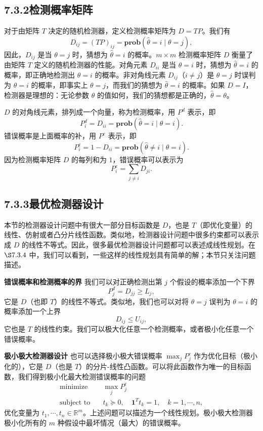 \documentclass[UTF8,12pt,a4paper,fontset=fandol]{ctexart}
\begin{document}
\subsection*{7.3.2\quad 检测概率矩阵}

对于由矩阵 $T$ 决定的随机检测器，定义检测概率矩阵为 $D=TP$。我们有
\[
D_{ij}=(TP)_{ij}=\mathbf{prob}(\hat{\theta}=i\mid \theta=j),
\]
因此，$D_{ij}$ 是当 $\theta=j$ 时，猜想为 $\hat{\theta}=i$ 的概率。$m\times m$ 检测概率矩阵 $D$ 衡量了由矩阵 $T$ 定义的随机检测器的性能。对角元素 $D_{ii}$ 是当 $\theta=i$ 时，猜想为 $\hat{\theta}=i$ 的概率，即正确地检测出 $\theta=i$ 的概率。非对角线元素 $D_{ij}$（$i\neq j$）是 $\theta=j$ 时误判为 $\theta=i$ 的概率，即事实上 $\theta=j$，而我们的猜想为 $\hat{\theta}=i$ 的概率。如果 $D=I$，检测器是理想的：无论参数 $\theta$ 的值如何，我们的猜想都是正确的，$\hat{\theta}=\theta$。

$D$ 的对角线元素，排列成一个向量，称为检测概率，用 $P^d$ 表示，即
\[
P_i^d=D_{ii}=\mathbf{prob}(\hat{\theta}=i\mid \theta=i).
\]
错误概率是上面概率的补，用 $P^e$ 表示，即
\[
P_i^e=1-D_{ii}=\mathbf{prob}(\hat{\theta}\neq i\mid \theta=i).
\]
因为检测概率矩阵 $D$ 的每列和为 $1$，错误概率可以表示为
\[
P_i^e=\sum_{j\neq i}D_{ji}.
\]

\subsection*{7.3.3\quad 最优检测器设计}

本节的检测器设计问题中有很大一部分目标函数是 $D$，也是 $T$（即优化变量）的线性、仿射或者凸分片线性函数。类似地，检测器设计问题中很多约束都可以表示成 $D$ 的线性不等式。因此，很多最优检测器设计问题都可以表述成线性规划。在 $\S 7.3.4$ 中，我们可以看到，一些这样的线性规划具有简单的解；本节只关注问题描述。

\noindent\textbf{错误概率和检测概率的界}\quad
我们可以对正确检测出第 $j$ 个假设的概率添加一个下界
\[
P_j^d=D_{jj}\geq L_j,
\]
它是 $D$（也即 $T$）的线性不等式。类似地，我们也可以对将 $\theta=j$ 误判为 $\theta=i$ 的概率添加一个上界
\[
D_{ij}\leq U_{ij},
\]
它也是 $T$ 的线性约束。我们可以极大化任意一个检测概率，或者极小化任意一个错误概率。

\noindent\textbf{极小极大检测器设计}\quad
也可以选择极小极大错误概率 $\max_j P_j^e$ 作为优化目标（极小化的），它是 $D$（也是 $T$）的分片-线性凸函数。可以将此函数作为唯一的目标函数，我们得到极小化最大检测错误概率的问题
\[
\begin{aligned}
\text{minimize}\quad & \max_j P_j^e\\
\text{subject to}\quad & t_k\succeq 0,\quad \mathbf{1}^Tt_k=1,\quad k=1,\cdots,n,
\end{aligned}
\]
优化变量为 $t_1,\cdots,t_n\in\mathbb{R}^m$。上述问题可以描述为一个线性规划。极小极大检测器极小化所有的 $m$ 种假设中最坏情况（最大）的错误概率。
\end{document}
